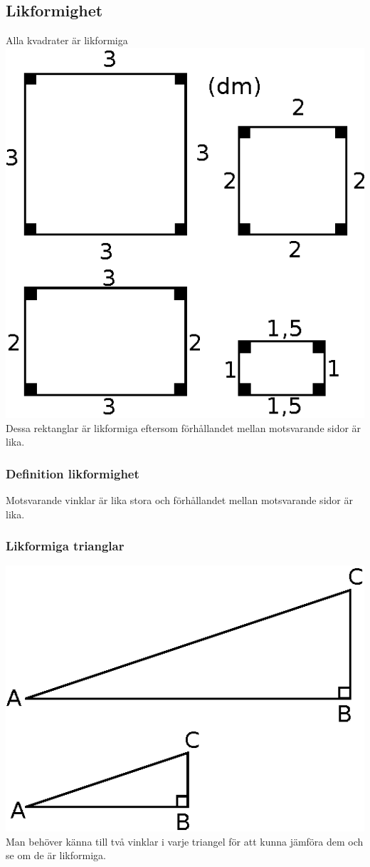 \documentclass[a4paper,10pt]{article}
\begin{document}
\begin{flushleft}
  \subsection{Likformighet}
    Alla kvadrater är likformiga\newline
    \includegraphics{likformighet.eps}\newline
    Dessa rektanglar är likformiga eftersom förhållandet mellan motsvarande sidor är lika.
    \subsubsection{Definition likformighet}
      Motsvarande vinklar är lika stora och förhållandet mellan motsvarande sidor är lika.

    \subsubsection{Likformiga trianglar}
      \includegraphics{likformighet2.eps}\newline
      Man behöver känna till två vinklar i varje triangel för att kunna jämföra dem och se om de är likformiga.

\end{flushleft}
\end{document}
